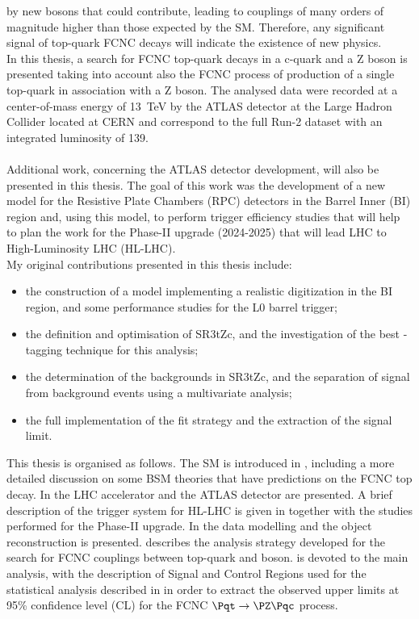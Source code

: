 by new bosons that could contribute, leading to couplings of many orders of magnitude higher
than those expected by the SM.
Therefore, any significant signal of top-quark FCNC decays will indicate the existence of new physics.
\vspace{\baselineskip}
\\In this thesis, a search for FCNC top-quark decays in a c-quark and a Z boson is presented taking into 
account also the FCNC process of production of a single top-quark in association with a Z boson.
The analysed data were recorded at a center-of-mass energy of \SI{13}{\TeV} by the ATLAS detector at 
the Large Hadron Collider located at CERN and correspond to the full Run-2 dataset 
with an integrated luminosity of \SI{139}{\ifb}.\\
\vspace{\baselineskip}
\\Additional work, concerning the ATLAS detector development, will also be presented in this thesis. 
The goal of this work was the development of a new model for the Resistive Plate Chambers (RPC) detectors in the Barrel Inner (BI) region and, using this model, to perform trigger efficiency studies that will help to plan the work for the Phase-II upgrade (2024-2025) that will lead LHC to High-Luminosity LHC (HL-LHC).
\vspace{\baselineskip}
\\My original contributions presented in this thesis include:
\begin{itemize}
	\item the construction of a model implementing a realistic digitization in the BI region, and some performance studies for the L0 barrel trigger;
	\item  the definition and optimisation of SR3tZc, and the investigation of the best \Pqc-tagging technique for this analysis;
	\item the determination of the backgrounds in SR3tZc, and the separation of signal from background events using a multivariate analysis;
	\item the full implementation of the fit strategy and the extraction of the signal limit. \\
\end{itemize}
\vspace{\baselineskip}
\noindent This thesis is organised as follows. The SM is introduced in  , including a
more detailed discussion on some BSM theories that have predictions on the FCNC top decay. 
In  the LHC accelerator and the ATLAS detector are presented. 
A brief description of the trigger system for HL-LHC is given in  together with the studies performed for the Phase-II upgrade. 
In   the data modelling and the object reconstruction is presented.
 describes the analysis strategy developed for the search for FCNC couplings between top-quark and \PZ boson.  is devoted to the main analysis, with the description of Signal and Control Regions used for the statistical analysis described in  in order to extract the observed upper limits at 95\% confidence level (CL) for the FCNC $\Pqt\rightarrow\PZ\Pqc$ process.
 
 
